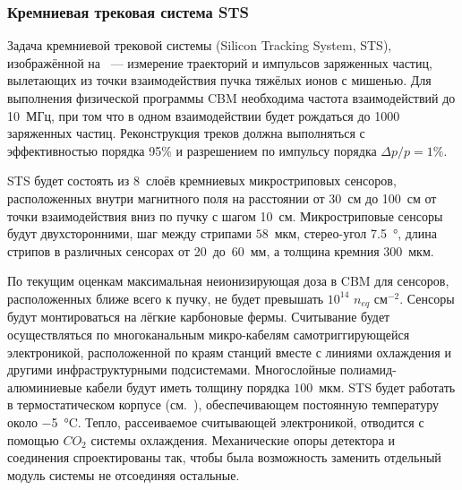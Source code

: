 \subsubsection{Кремниевая трековая система STS}\label{sec:secSTS}


Задача кремниевой трековой системы (Silicon Tracking System, STS), изображённой на~ --- измерение траекторий и импульсов заряженных частиц, вылетающих из точки взаимодействия пучка тяжёлых ионов с мишенью. Для выполнения физической программы CBM необходима частота взаимодействий до 10~МГц, при том что в одном взаимодействии будет рождаться до 1000 заряженных частиц. Реконструкция треков должна выполняться с эффективностью порядка 95\% и разрешением по импульсу порядка $\Delta p / p = 1\%$.


STS будет состоять из 8~слоёв кремниевых микростриповых сенсоров, расположенных внутри магнитного поля на расстоянии от 30~см до 100~см от точки взаимодействия вниз по пучку с шагом 10~см.
Микростриповые сенсоры будут двухсторонними, шаг между стрипами $58$~мкм, стерео-угол \SI{7.5}{\degree}, длина стрипов в различных сенсорах от 20~до~60~мм, а толщина кремния $300$~мкм.

По текущим оценкам максимальная неионизирующая доза в CBM для сенсоров, расположенных ближе всего к пучку, не будет превышать $10^{14}$ $n_{eq}$ см$^{-2}$.
Сенсоры будут монтироваться на лёгкие карбоновые фермы. Считывание будет осуществляться по многоканальным микро-кабелям самотриггирующейся электроникой, расположенной по краям станций вместе с линиями охлаждения и другими инфраструктурными подсистемами.
Многослойные полиамид-алюминиевые кабели будут иметь толщину порядка $100$~мкм.
STS будет работать в термостатическом корпусе (см.~), обеспечивающем постоянную температуру около \SI{-5}{\degreeCelsius}. Тепло, рассеиваемое считывающей электроникой, отводится с помощью $CO_{2}$ системы охлаждения. Механические опоры детектора и соединения спроектированы так, чтобы была возможность заменить отдельный модуль системы не отсоединяя остальные.

